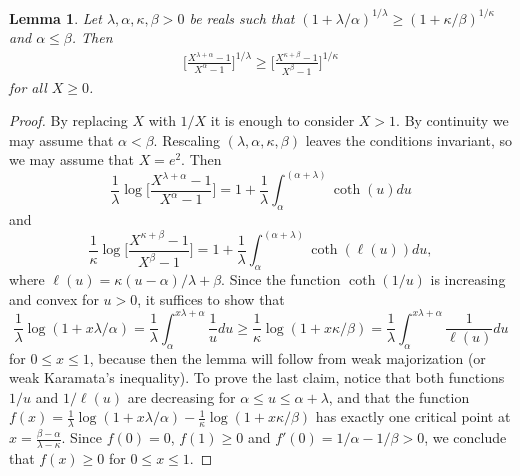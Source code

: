\documentclass[a4paper,reqno,12pt]{amsart}
\newtheorem{lemma}[theorem]{Lemma}
\newcommand{\la}{\lambda}
\newcommand{\al}{\alpha}
\newcommand{\be}{\beta}
\newcommand{\ka}{\kappa}
\newcommand{\1}{\bo{1}}
\begin{document}
\begin{lemma}\label{lem:1Dkaramata}
Let $\la,\al,\ka,\be>0$ be reals such that $(1+\la/\al)^{1/\la} \ge (1+\ka/\be)^{1/\ka}$ and  $ \al \leq \be$. Then
\begin{align*}
\bigg[\frac{X^{\la+\al}-1}{X^{\al}-1}\bigg]^{1/\la} \geq \bigg[\frac{X^{\ka+\be}-1}{X^{\be}-1}\bigg]^{1/\ka}
\end{align*}
for all $X\geq 0$.
\end{lemma}
\begin{proof}
By replacing $X$ with $1/X$ it is enough to consider $X>1$. By continuity we may assume that $\al<\be$. Rescaling $(\la,\al,\ka,\be)$ leaves the conditions invariant, so we may assume that $X=e^{2}$. Then
$$
\frac{1}{\la}\log\bigg[\frac{X^{\la+\al}-1}{X^{\al}-1}\bigg] = 1+\frac{1}{\la} \int_{\al}^{(\al+\la)} \coth(u) du
$$
and
$$ \frac{1}{\ka }\log\bigg[\frac{X^{\ka+\be}-1}{X^{\be}-1}\bigg] = 1+\frac{1}{\la}\int_{\al}^{(\al+\la)} \coth(\ell(u)) du,
$$
where $\ell(u)=\ka (u-\al)/\la + \be $. Since the function $\coth(1/u)$ is increasing and convex for $u>0$, it suffices to show that
$$
\frac1{\la}\log(1+x\la/\al)=\frac1\la \int_\al^{x\la+\al} \frac{1}{u}d u \geq \frac1{\ka}\log(1+x\ka/\be)=\frac1\la \int_\al^{x\la+\al} \frac{1}{\ell(u)}d u
$$
for $0 \leq x \leq 1$, because then the lemma will follow from weak majorization (or weak Karamata's inequality). To prove the last claim, notice that both functions $1/u$ and $1/\ell(u)$ are decreasing for $\al\leq u \leq \al+\la$, and that the function 
$f(x)=\frac1{\la}\log(1+x\la/\al)-\frac1{\ka}\log(1+x\ka/\be)$ has exactly one critical point at $x=\frac{\be-\al}{\la-\ka}$. Since $f(0)=0$, $f(1)\geq 0$ and $f'(0)=1/\al-1/\be>0$, we conclude that $f(x)\geq 0$ for $0\leq x\leq 1$.
\end{proof}
\end{document}
